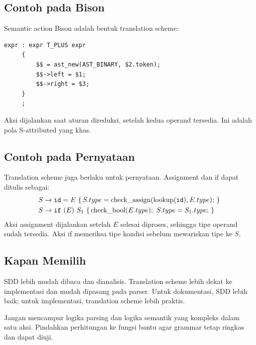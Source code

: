 \subsection{Contoh pada Bison}

Semantic action Bison adalah bentuk translation scheme:
\begin{lstlisting}[language=Bison]
expr : expr T_PLUS expr
     {
         $$ = ast_new(AST_BINARY, $2.token);
         $$->left = $1;
         $$->right = $3;
     }
     ;
\end{lstlisting}
Aksi dijalankan saat aturan direduksi, setelah kedua operand
tersedia. Ini adalah pola S-attributed yang khas.

\subsection{Contoh pada Pernyataan}

Translation scheme juga berlaku untuk pernyataan. Assignment dan if
dapat ditulis sebagai:
\[
\begin{aligned}
S &\to \texttt{id} = E\ \{\, S.type =
\text{check\_assign}(\text{lookup}(\texttt{id}), E.type); \,\}\\
S &\to \texttt{if}\ (E)\ S_1\ \{\, \text{check\_bool}(E.type);\
S.type = S_1.type; \,\}
\end{aligned}
\]
Aksi assignment dijalankan setelah \(E\) selesai diproses, sehingga
tipe operand sudah tersedia. Aksi if memeriksa tipe kondisi sebelum
mewariskan tipe ke \(S\).

\subsection{Kapan Memilih}

SDD lebih mudah dibaca dan dianalisis. Translation scheme lebih
dekat ke implementasi dan mudah dipasang pada parser. Untuk
dokumentasi, SDD lebih baik; untuk implementasi, translation scheme
lebih praktis.

\begin{infobox}
Jangan mencampur logika parsing dan logika semantik yang kompleks
dalam satu aksi. Pindahkan perhitungan ke fungsi bantu agar grammar
tetap ringkas dan dapat diuji.
\end{infobox}
